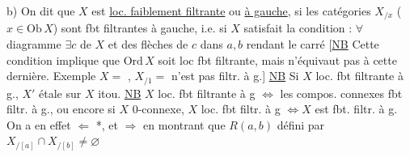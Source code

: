 b) On dit que $X$ est \uline{loc. faiblement filtrante}  ou
  \uline{à gauche},  si les catégories $X_{/x}$ ($x\in\mathrm{Ob}\,X$) sont fbt filtrantes à gauche, i.e. si $X$ satisfait la condition : $\forall$ diagramme
$\exists c$ de $X$ et des flèches de $c$ dans $a,b$ rendant  le carré
[\uline{NB} Cette condition  implique que $\mathrm{Ord}\,X$ soit loc fbt filtrante, mais n'équivaut pas à cette dernière. Exemple $X={}$%
, $X_{/1}={}$%
n'est pas  filtr. à g.]
\uline{NB} Si $X$ loc. fbt filtrante à g.,  $X'$ étale sur $X$ itou.
\uline{NB} $X$ loc. fbt filtrante à g $\Longleftrightarrow$ les compos.  connexes  fbt filtr. à g., ou encore si $X$  0-connexe, $X$ loc. fbt filtr. à g $\Longleftrightarrow X$ est  fbt. filtr. à g.
On a en effet $\Longleftarrow$ *, et $\Longrightarrow$  en montrant   que  $R(a,b)$ défini par $X_{/[a]}\cap X_{/[b]}\ne\varnothing$
